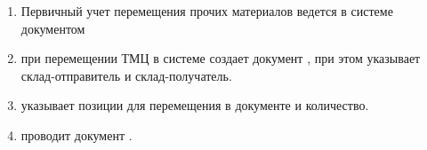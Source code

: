 \begin{enumerate}
\item  	Первичный учет перемещения прочих материалов ведется в системе \gofro документом 
\item	\kladovshik при перемещении ТМЦ  в системе \gofro создает документ , при этом указывает склад-отправитель и склад-получатель.
\item 	\kladovshik указывает позиции  для перемещения в документе  и количество.
\item 	\kladovshik проводит документ  .
\end{enumerate}






